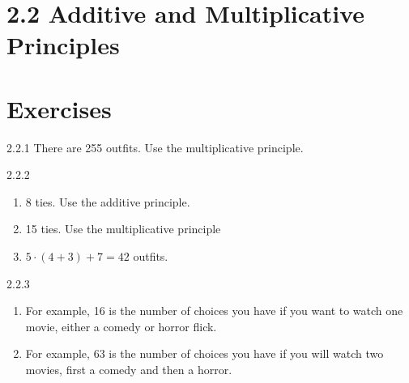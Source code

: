 \documentclass[11pt,]{book}
\theoremstyle{ptxplainnotitle}
\theoremstyle{ptxplaintitle}
\theoremstyle{ptxdefinitionnotitle}
\theoremstyle{ptxdefinitiontitle}
\theoremstyle{ptxdefinitionnotitle}
\theoremstyle{ptxdefinitiontitle}
\theoremstyle{ptxdefinitionnotitle}
\theoremstyle{ptxdefinitiontitle}
\theoremstyle{ptxdefinitiontitlenonumber}
\theoremstyle{ptxdefinitiontitlenonumber}
\numberwithin{equation}{chapter}
\begin{document}
\section*{2.2 Additive and Multiplicative Principles}
\section*{Exercises}
\begin{divisionexercise}{2.2.1}
\textbf{}\hypertarget{p-1062}{}%
There are 255 outfits. Use the multiplicative principle.%
\end{divisionexercise}%
\begin{divisionexercise}{2.2.2}
\textbf{}\hypertarget{p-1079}{}%
\leavevmode%
\begin{enumerate}[label=(\alph*)]
\item\hypertarget{li-463}{}\hypertarget{p-1080}{}%
8 ties.  Use the additive principle.%
\item\hypertarget{li-464}{}\hypertarget{p-1081}{}%
15 ties. Use the multiplicative principle%
\item\hypertarget{li-465}{}\hypertarget{p-1082}{}%
\(5\cdot (4+3) + 7 = 42\) outfits.%
\end{enumerate}
%
\end{divisionexercise}%
\begin{divisionexercise}{2.2.3}
\textbf{}\hypertarget{p-1086}{}%
\leavevmode%
\begin{enumerate}[label=(\alph*)]
\item\hypertarget{li-468}{}\hypertarget{p-1087}{}%
For example, 16 is the number of choices you have if you want to watch one movie, either a comedy or horror flick.%
\item\hypertarget{li-469}{}\hypertarget{p-1088}{}%
For example, 63 is the number of choices you have if you will watch two movies, first a comedy and then a horror.%
\end{enumerate}
%
\end{divisionexercise}%
\end{document}
